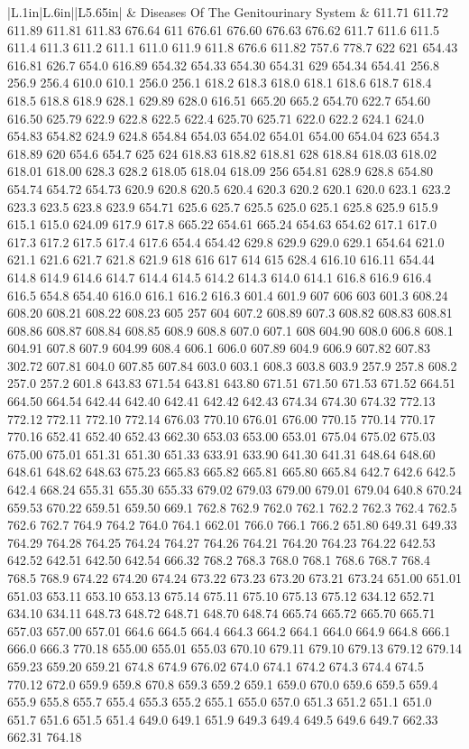 \begin{longtable}{|L{.1in}|L{.6in}||L{5.65in}|}
   & Diseases Of The Genitourinary System   &  611.71 611.72 611.89 611.81 611.83 676.64 611 676.61 676.60 676.63 676.62 611.7 611.6 611.5 611.4 611.3 611.2 611.1 611.0 611.9 611.8 676.6 611.82 757.6 778.7 622 621 654.43 616.81 626.7 654.0 616.89 654.32 654.33 654.30 654.31 629 654.34 654.41 256.8 256.9 256.4 610.0 610.1 256.0 256.1 618.2 618.3 618.0 618.1 618.6 618.7 618.4 618.5 618.8 618.9 628.1 629.89 628.0 616.51 665.20 665.2 654.70 622.7 654.60 616.50 625.79 622.9 622.8 622.5 622.4 625.70 625.71 622.0 622.2 624.1 624.0 654.83 654.82 624.9 624.8 654.84 654.03 654.02 654.01 654.00 654.04 623 654.3 618.89 620 654.6 654.7 625 624 618.83 618.82 618.81 628 618.84 618.03 618.02 618.01 618.00 628.3 628.2 618.05 618.04 618.09 256 654.81 628.9 628.8 654.80 654.74 654.72 654.73 620.9 620.8 620.5 620.4 620.3 620.2 620.1 620.0 623.1 623.2 623.3 623.5 623.8 623.9 654.71 625.6 625.7 625.5 625.0 625.1 625.8 625.9 615.9 615.1 615.0 624.09 617.9 617.8 665.22 654.61 665.24 654.63 654.62 617.1 617.0 617.3 617.2 617.5 617.4 617.6 654.4 654.42 629.8 629.9 629.0 629.1 654.64 621.0 621.1 621.6 621.7 621.8 621.9 618 616 617 614 615 628.4 616.10 616.11 654.44 614.8 614.9 614.6 614.7 614.4 614.5 614.2 614.3 614.0 614.1 616.8 616.9 616.4 616.5 654.8 654.40 616.0 616.1 616.2 616.3 601.4 601.9 607 606 603 601.3 608.24 608.20 608.21 608.22 608.23 605 257 604 607.2 608.89 607.3 608.82 608.83 608.81 608.86 608.87 608.84 608.85 608.9 608.8 607.0 607.1 608 604.90 608.0 606.8 608.1 604.91 607.8 607.9 604.99 608.4 606.1 606.0 607.89 604.9 606.9 607.82 607.83 302.72 607.81 604.0 607.85 607.84 603.0 603.1 608.3 603.8 603.9 257.9 257.8 608.2 257.0 257.2 601.8 643.83 671.54 643.81 643.80 671.51 671.50 671.53 671.52 664.51 664.50 664.54 642.44 642.40 642.41 642.42 642.43 674.34 674.30 674.32 772.13 772.12 772.11 772.10 772.14 676.03 770.10 676.01 676.00 770.15 770.14 770.17 770.16 652.41 652.40 652.43 662.30 653.03 653.00 653.01 675.04 675.02 675.03 675.00 675.01 651.31 651.30 651.33 633.91 633.90 641.30 641.31 648.64 648.60 648.61 648.62 648.63 675.23 665.83 665.82 665.81 665.80 665.84 642.7 642.6 642.5 642.4 668.24 655.31 655.30 655.33 679.02 679.03 679.00 679.01 679.04 640.8 670.24 659.53 670.22 659.51 659.50 669.1 762.8 762.9 762.0 762.1 762.2 762.3 762.4 762.5 762.6 762.7 764.9 764.2 764.0 764.1 662.01 766.0 766.1 766.2 651.80 649.31 649.33 764.29 764.28 764.25 764.24 764.27 764.26 764.21 764.20 764.23 764.22 642.53 642.52 642.51 642.50 642.54 666.32 768.2 768.3 768.0 768.1 768.6 768.7 768.4 768.5 768.9 674.22 674.20 674.24 673.22 673.23 673.20 673.21 673.24 651.00 651.01 651.03 653.11 653.10 653.13 675.14 675.11 675.10 675.13 675.12 634.12 652.71 634.10 634.11 648.73 648.72 648.71 648.70 648.74 665.74 665.72 665.70 665.71 657.03 657.00 657.01 664.6 664.5 664.4 664.3 664.2 664.1 664.0 664.9 664.8 666.1 666.0 666.3 770.18 655.00 655.01 655.03 670.10 679.11 679.10 679.13 679.12 679.14 659.23 659.20 659.21 674.8 674.9 676.02 674.0 674.1 674.2 674.3 674.4 674.5 770.12 672.0 659.9 659.8 670.8 659.3 659.2 659.1 659.0 670.0 659.6 659.5 659.4 655.9 655.8 655.7 655.4 655.3 655.2 655.1 655.0 657.0 651.3 651.2 651.1 651.0 651.7 651.6 651.5 651.4 649.0 649.1 651.9 649.3 649.4 649.5 649.6 649.7 662.33 662.31 764.18 
\end{longtable}
